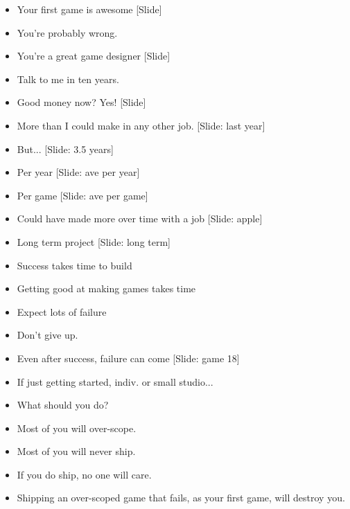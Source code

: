 \documentclass[12pt]{article}
\begin{document}
{\begin{itemize}
\item Your first game is awesome [Slide]

\item You're probably wrong.

\item You're a great game designer [Slide]

\item Talk to me in ten years.

\item Good money now?  Yes!  [Slide]

\item More than I could make in any other job. [Slide: last year]

\item But... [Slide: 3.5 years]

\item Per year [Slide:  ave per year]

\item Per game [Slide:  ave per game]

\item Could have made more over time with a job [Slide:  apple]

\item Long term project [Slide: long term]

\item Success takes time to build

\item Getting good at making games takes time

\item  Expect lots of failure

\item Don't give up.

\item Even after success, failure can come [Slide: game 18]

\item If just getting started, indiv. or small studio...

\item What should you do?

\item Most of you will over-scope.

\item Most of you will never ship.

\item If you do ship, no one will care.

\item Shipping an over-scoped game that fails, as your first game, will destroy you.


\end{itemize}}
\end{document}
